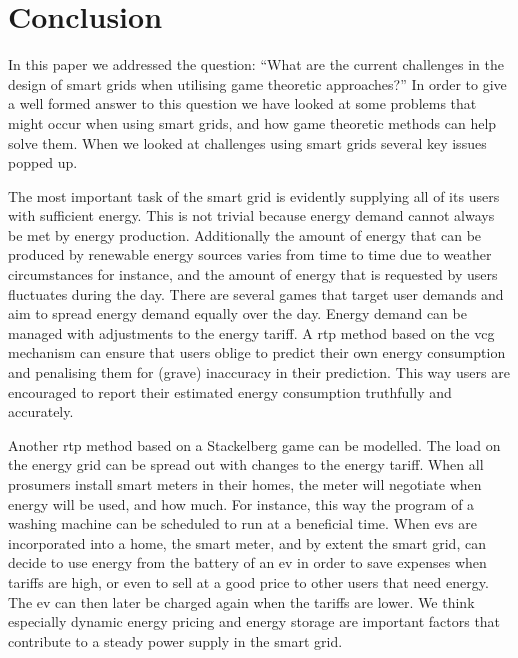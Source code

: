 \section{Conclusion}\label{conclusion}
\acresetall
In this paper we addressed the question: ``What are the current challenges in the design of smart grids when utilising game theoretic approaches?'' In order to give a well formed answer to this question we have looked at some problems that might occur when using smart grids, and how game theoretic methods can help solve them. When we looked at challenges using smart grids several key issues popped up. 

The most important task of the smart grid is evidently supplying all of its users with sufficient energy. This is not trivial because energy demand cannot always be met by energy production. Additionally the amount of energy that can be produced by renewable energy sources varies from time to time due to weather circumstances for instance, and the amount of energy that is requested by users fluctuates during the day. There are several games that target user demands and aim to spread energy demand equally over the day. Energy demand can be managed with adjustments to the energy tariff. A \ac{rtp} method based on the \ac{vcg} mechanism can ensure that users oblige to predict their own energy consumption and penalising them for (grave) inaccuracy in their prediction. This way users are encouraged to report their estimated energy consumption truthfully and accurately. 

Another \ac{rtp} method based on a Stackelberg game can be modelled. The load on the energy grid can be spread out with changes to the energy tariff. When all prosumers install smart meters in their homes, the meter will negotiate when energy will be used, and how much. For instance, this way the program of a washing machine can be scheduled to run at a beneficial time. When \acp{ev} are incorporated into a home, the smart meter, and by extent the smart grid, can decide to use energy from the battery of an \ac{ev} in order to save expenses when tariffs are high, or even to sell at a good price to other users that need energy. The \ac{ev} can then later be charged again when the tariffs are lower. 
We think especially dynamic energy pricing and energy storage are important factors that contribute to a steady power supply in the smart grid.

